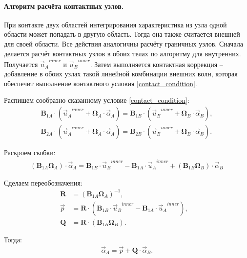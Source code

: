 \documentclass[a4paper]{article}
\numberwithin{equation}{section}
\begin{document}
\paragraph{Алгоритм расчёта контактных узлов.}
\label{sec:good-contact-case}
При контакте двух областей интегрирования характеристика из узла
одной области может попадать в другую область. Тогда она также считается
внешней для своей области. 
Все действия аналогичны расчёту граничных узлов. 
Сначала делается расчёт контактных узлов в обоих телах по алгоритму для внутренних.
Получается ${\vec{u}_A}^{inner}$ и ${\vec{u}_B}^{inner}$. 
Затем выполняется контактная коррекция -- 
добавление в обоих узлах такой линейной комбинации внешних волн, 
которая обеспечит выполнение контактного условия \eqref{contact_condition}. 

Распишем сообразно сказанному условие \eqref{contact_condition}:
\begin{eqnarray}
	\mathbf{B}_{1A} \cdot ({\vec{u}_A}^{inner} + \mathbf{\Omega}_A \cdot \vec{\alpha}_A) = \mathbf{B}_{1B} \cdot ({\vec{u}_B}^{inner} + \mathbf{\Omega}_B \cdot \vec{\alpha}_B), \\
\label{second_line_in_contact_condition_wide}
	\mathbf{B}_{2A} \cdot ({\vec{u}_A}^{inner} + \mathbf{\Omega}_A \cdot \vec{\alpha}_A) = \mathbf{B}_{2B} \cdot ({\vec{u}_B}^{inner} + \mathbf{\Omega}_B \cdot \vec{\alpha}_B).
\end{eqnarray}

Раскроем скобки:
\begin{eqnarray}
	(\mathbf{B}_{1A} \mathbf{\Omega}_A) \cdot  \vec{\alpha}_A = \mathbf{B}_{1B} \cdot {\vec{u}_B}^{inner} - \mathbf{B}_{1A} \cdot {\vec{u}_A}^{inner} + (\mathbf{B}_{1B} \mathbf{\Omega}_B) \cdot \vec{\alpha}_B
\end{eqnarray}

Сделаем переобозначения:
\begin{align}
\label{matrixRcontact}
\mathbf{R} &= (\mathbf{B}_{1A} \mathbf{\Omega}_A)^{-1}, &\\
\vec{p} &= \mathbf{R} \cdot (\mathbf{B}_{1B} \cdot {\vec{u}_B}^{inner} - \mathbf{B}_{1A} \cdot {\vec{u}_A}^{inner}), &\\
\mathbf{Q} &= \mathbf{R} \cdot (\mathbf{B}_{1B} \mathbf{\Omega}_B).
\end{align}

Тогда:
\begin{eqnarray}
\label{alpha_A_from_B}
\vec{\alpha}_A = \vec{p} + \mathbf{Q} \cdot \vec{\alpha}_B.
\end{eqnarray}
\end{document}
